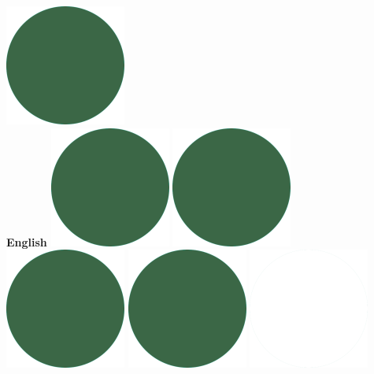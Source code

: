 \documentclass[]{friggeri-cv-theme}
\newcommand{\belowspace}{\vspace*{0.85mm}}
\begin{document}
\begin{aside}
    \includegraphics[scale=0.11]{img/IPSGreenDots.png}\\
    \belowspace
    \textbf{English}\hfill
    \includegraphics[scale=0.11]{img/IPSGreenDots.png}
    \includegraphics[scale=0.11]{img/IPSGreenDots.png}
    \includegraphics[scale=0.11]{img/IPSGreenDots.png}
    \includegraphics[scale=0.11]{img/IPSGreenDots.png}
    \includegraphics[scale=0.11]{img/WhiteDots.png}

\end{aside}
\end{document}

